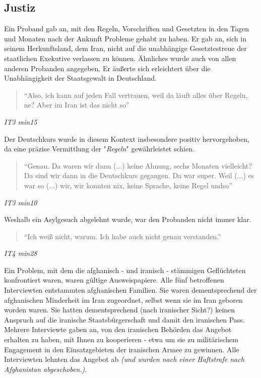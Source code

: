 \subsection{Justiz}
   
Ein Proband gab an, mit den Regeln, Vorschriften und Gesetzten in den Tagen und Monaten nach der Ankunft Probleme gehabt zu haben. Er gab an, sich in seinem Herkunftsland, dem Iran, nicht auf die unabhängige Gesetztestreue der staatlichen Exekutive verlassen zu können. Ähnliches wurde auch von allen anderen Probanden angegeben. Er äußerte sich erleichtert über die Unabhängigkeit der Staatsgewalt in Deutschland.
\begin{quote}
    ``Also, ich kann auf jeden Fall vertrauen, weil da läuft alles über Regeln, ne? Aber im Iran ist das nicht so''
\end{quote}
\centerline{\textit{IT3 min15}}
Der Deutschkurs wurde in diesem Kontext insbesondere positiv hervorgehoben, da eine präzise Vermittlung der "\textit{Regeln}" gewährleistet schien.
\begin{quote}
    ``Genau. Da waren wir dann (...) keine Ahnung, sechs Monaten vielleicht? Da sind wir dann in die Deutschkurs gegangen. Da war super. Weil (...) es war so (...) wir, wir konnten nix, keine Sprache, keine Regel undso''
\end{quote}
\centerline{\textit{IT3 min10}}
%
Weshalb ein Asylgesuch abgelehnt wurde, war den Probanden nicht immer klar.
\begin{quote}
    ``Ich weiß nicht, warum. Ich habe auch nicht genau verstanden.''
\end{quote}
\centerline{\textit{IT4 min28}}
%
Ein Problem, mit dem die afghanisch - und iranisch - stämmigen Geflüchteten konfrontiert waren, waren gültige Ausweispapiere.\newline
Alle fünf betroffenen Interviewten entstammten afghanischen Familien. Sie waren dementsprechend der afghanischen Minderheit im Iran zugeordnet, selbst wenn sie im Iran geboren worden waren. Sie hatten dementsprechend (nach iranischer Sicht?) keinen Anspruch auf die iranische Staatsbürgerschaft und damit den iranischen Pass.\newline
Mehrere Interviewte gaben an, von den iranischen Behörden das Angebot erhalten zu haben, mit Ihnen zu kooperieren - etwa um sie zu militärischem Engagement in den Einsatzgebieten der iranischen Armee zu gewinnen. Alle Interviewten lehnten das Angebot ab \textit{(und wurden nach einer Haftstrafe nach Afghanistan abgeschoben.)}. 
